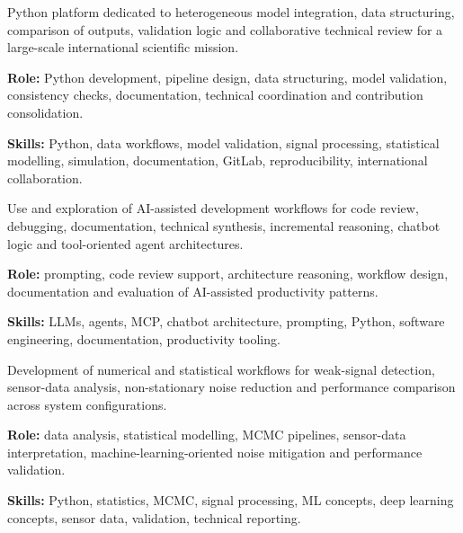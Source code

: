 \documentclass[8pt,a4paper,ragged2e,withhyper]{../_shared/altacv}
\begin{document}
Python platform dedicated to heterogeneous model integration, data structuring, comparison of outputs, validation logic and collaborative technical review for a large-scale international scientific mission.

\textbf{Role:} Python development, pipeline design, data structuring, model validation, consistency checks, documentation, technical coordination and contribution consolidation.

\textbf{Skills:} Python, data workflows, model validation, signal processing, statistical modelling, simulation, documentation, GitLab, reproducibility, international collaboration.

\divider


Use and exploration of AI-assisted development workflows for code review, debugging, documentation, technical synthesis, incremental reasoning, chatbot logic and tool-oriented agent architectures.

\textbf{Role:} prompting, code review support, architecture reasoning, workflow design, documentation and evaluation of AI-assisted productivity patterns.

\textbf{Skills:} LLMs, agents, MCP, chatbot architecture, prompting, Python, software engineering, documentation, productivity tooling.

\divider


Development of numerical and statistical workflows for weak-signal detection, sensor-data analysis, non-stationary noise reduction and performance comparison across system configurations.

\textbf{Role:} data analysis, statistical modelling, MCMC pipelines, sensor-data interpretation, machine-learning-oriented noise mitigation and performance validation.

\textbf{Skills:} Python, statistics, MCMC, signal processing, ML concepts, deep learning concepts, sensor data, validation, technical reporting.


\vspace{-.3cm}

\end{document}
